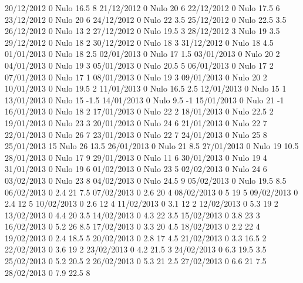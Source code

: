 20/12/2012  0     Nulo    16.5   8 
21/12/2012  0     Nulo    20     6 
22/12/2012  0     Nulo    17.5   6 
23/12/2012  0     Nulo    20     6 
24/12/2012  0     Nulo    22     3.5 
25/12/2012  0     Nulo    22.5   3.5 
26/12/2012  0     Nulo    13     2 
27/12/2012  0     Nulo    19.5   3 
28/12/2012  3     Nulo    19     3.5 
29/12/2012  0     Nulo    18     2 
30/12/2012  0     Nulo    18     3 
31/12/2012  0     Nulo    18     4.5 
01/01/2013  0     Nulo    18     2.5 
02/01/2013  0     Nulo    17     1.5 
03/01/2013  0     Nulo    20     2 
04/01/2013  0     Nulo    19     3 
05/01/2013  0     Nulo    20.5   5 
06/01/2013  0     Nulo    17     2 
07/01/2013  0     Nulo    17     1 
08/01/2013  0     Nulo    19     3 
09/01/2013  0     Nulo    20     2 
10/01/2013  0     Nulo    19.5   2 
11/01/2013  0     Nulo    16.5   2.5 
12/01/2013  0     Nulo    15     1 
13/01/2013  0     Nulo    15    -1.5 
14/01/2013  0     Nulo    9.5   -1 
15/01/2013  0     Nulo    21    -1 
16/01/2013  0     Nulo    18     2 
17/01/2013  0     Nulo    22     2 
18/01/2013  0     Nulo    22.5   2 
19/01/2013  0     Nulo    23     3 
20/01/2013  0     Nulo    24     6 
21/01/2013  0     Nulo    22     7 
22/01/2013  0     Nulo    26     7 
23/01/2013  0     Nulo    22     7 
24/01/2013  0     Nulo    25     8 
25/01/2013  15    Nulo    26     13.5 
26/01/2013  0     Nulo    21     8.5 
27/01/2013  0     Nulo    19     10.5 
28/01/2013  0     Nulo    17     9 
29/01/2013  0     Nulo    11     6 
30/01/2013  0     Nulo    19     4 
31/01/2013  0     Nulo    19     6 
01/02/2013  0     Nulo    23     5 
02/02/2013  0     Nulo    24     6 
03/02/2013  0     Nulo    23     8 
04/02/2013  0     Nulo    24.5   9 
05/02/2013  0     Nulo    19.5   8.5 
06/02/2013  0      2.4    21     7.5 
07/02/2013  0      2.6    20     4 
08/02/2013  0      5      19     5 
09/02/2013  0      2.4    12     5 
10/02/2013  0      2.6    12     4 
11/02/2013  0      3.1    12     2 
12/02/2013  0      5.3    19     2 
13/02/2013  0      4.4    20     3.5 
14/02/2013  0      4.3    22     3.5 
15/02/2013  0      3.8    23     3 
16/02/2013  0      5.2    26     8.5 
17/02/2013  0      3.3    20     4.5 
18/02/2013  0      2.2    22     4 
19/02/2013  0      2.4    18.5   5 
20/02/2013  0      2.8    17     4.5 
21/02/2013  0      3.3    16.5   2 
22/02/2013  0      3.6    19     2 
23/02/2013  0      4.2    21.5   3 
24/02/2013  0      6.3    19.5   3.5 
25/02/2013  0      5.2    20.5   2 
26/02/2013  0      5.3    21     2.5 
27/02/2013  0      6.6    21     7.5 
28/02/2013  0      7.9    22.5   8 
